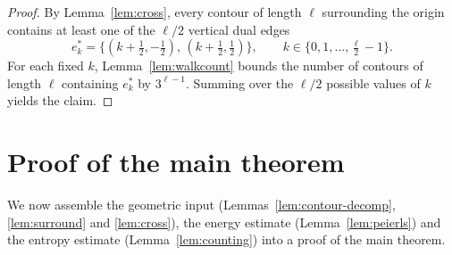 \documentclass[11pt]{article}
\theoremstyle{plain}
\theoremstyle{definition}
\theoremstyle{remark}
\begin{document}
\begin{proof}
By Lemma~\ref{lem:cross}, every contour of length $\ell$ surrounding the
origin contains at least one of the $\ell/2$ vertical dual edges
\[
  e^*_k=\big\{(k+\tfrac12,-\tfrac12),\,(k+\tfrac12,\tfrac12)\big\},
  \qquad k\in\{0,1,\dots,\tfrac{\ell}{2}-1\}.
\]
For each fixed $k$, Lemma~\ref{lem:walkcount} bounds the number of contours
of length $\ell$ containing $e^*_k$ by $3^{\ell-1}$. Summing over the
$\ell/2$ possible values of $k$ yields the claim.
\end{proof}

\section{Proof of the main theorem}
\label{sec:conclusion}

We now assemble the geometric input (Lemmas~\ref{lem:contour-decomp},
\ref{lem:surround} and \ref{lem:cross}), the energy estimate
(Lemma~\ref{lem:peierls}) and the entropy estimate
(Lemma~\ref{lem:counting}) into a proof of the main theorem.
\end{document}
